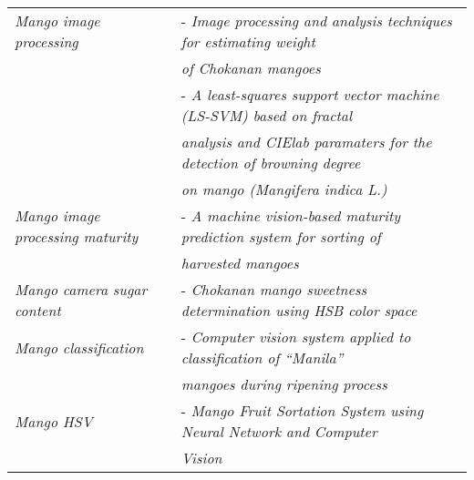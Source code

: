 \begin{anexosenv}
\begin{center}
\begin{longtable}{ll}

\textit{Mango image processing}				& - \textit{Image processing and analysis techniques for estimating weight} \\
											& \textit{of Chokanan mangoes} \\ 
											& - \textit{A least-squares support vector machine (LS-SVM) based on fractal}  \\ 
											& \textit{analysis and CIElab paramaters for the detection of browning degree} \\ 
											& \textit{on mango (Mangifera indica L.)} \\ \hline

\textit{Mango image processing maturity}	& - \textit{A machine vision-based maturity prediction system for sorting of} \\
											&	\textit{harvested mangoes} \\ \hline

\textit{Mango camera sugar content}			& - \textit{Chokanan mango sweetness determination using HSB color space} \\ \hline

\textit{Mango classification} 				& - \textit{Computer vision system applied to classification of “Manila”} \\
											& 	\textit{mangoes during ripening process} \\ \hline

\textit{Mango HSV}							& - \textit{Mango Fruit Sortation System using Neural Network and Computer} \\
											& 	\textit{Vision} \\ \hline


\end{longtable}
\end{center}
\end{anexosenv}
